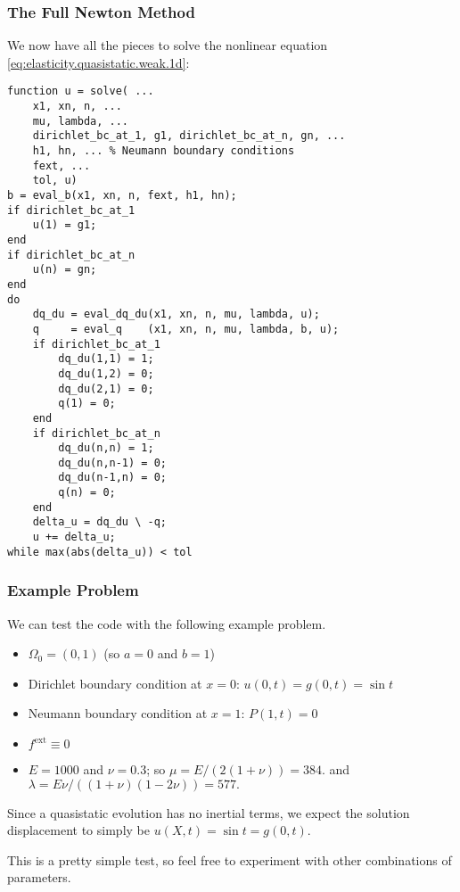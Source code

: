 \vspace{.5\baselineskip}
\subsubsection{The Full Newton Method}

We now have all the pieces to solve the nonlinear equation \eqref{eq:elasticity.quasistatic.weak.1d}:
\begin{verbatim}
function u = solve( ...
    x1, xn, n, ...
    mu, lambda, ...
    dirichlet_bc_at_1, g1, dirichlet_bc_at_n, gn, ...
    h1, hn, ... % Neumann boundary conditions
    fext, ...
    tol, u)
b = eval_b(x1, xn, n, fext, h1, hn);
if dirichlet_bc_at_1
    u(1) = g1;
end
if dirichlet_bc_at_n
    u(n) = gn;
end
do
    dq_du = eval_dq_du(x1, xn, n, mu, lambda, u);
    q     = eval_q    (x1, xn, n, mu, lambda, b, u);
    if dirichlet_bc_at_1
        dq_du(1,1) = 1;
        dq_du(1,2) = 0;
        dq_du(2,1) = 0;
        q(1) = 0;
    end
    if dirichlet_bc_at_n
        dq_du(n,n) = 1;
        dq_du(n,n-1) = 0;
        dq_du(n-1,n) = 0;
        q(n) = 0;
    end
    delta_u = dq_du \ -q;
    u += delta_u;
while max(abs(delta_u)) < tol
\end{verbatim}

\vspace{.5\baselineskip}
\subsubsection{Example Problem}

We can test the code with the following example problem.
\begin{itemize}
\item $\Omega_0 = (0,1)$ (so $a = 0$ and $b = 1$)
\item Dirichlet boundary condition at $x = 0$: $u(0,t) = g(0,t) = \sin t$
\item Neumann boundary condition at $x = 1$: $P(1,t) = 0$
\item $f^{\text{ext}} \equiv 0$
\item $E = 1000$ and $\nu = 0.3$; so $\mu = E / (2 (1 + \nu)) = 384.$ and $\lambda = E \nu / ((1 + \nu) (1 - 2\nu)) = 577.$
\end{itemize}
Since a quasistatic evolution has no inertial terms, we expect the solution displacement to simply be $u(X,t) = \sin t = g(0,t)$.

This is a pretty simple test, so feel free to experiment with other combinations of parameters.

